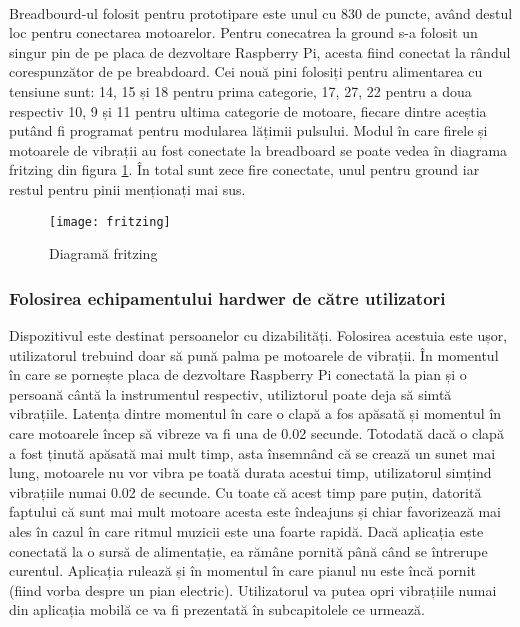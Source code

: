 \documentclass[../IoMusT.tex]{subfiles}
\begin{document}
\\
\par Breadbourd-ul folosit pentru prototipare este unul cu 830 de puncte, având destul loc pentru conectarea motoarelor. Pentru conecatrea la ground s-a folosit un singur pin de pe placa de dezvoltare  Raspberry Pi, acesta fiind conectat la rândul corespunzător de pe breabdoard. Cei nouă pini folosiți pentru alimentarea cu tensiune sunt: 14, 15 și 18 pentru prima categorie, 17, 27, 22 pentru a doua respectiv 10, 9 și 11 pentru ultima categorie de motoare, fiecare dintre aceștia putând fi programat pentru modularea lățimii pulsului. Modul în care firele și motoarele de vibrații au fost conectate la breadboard se poate vedea în diagrama fritzing din figura \ref{fig:breadboardConnection}. În total sunt zece fire conectate, unul pentru ground iar restul pentru pinii menționați mai sus.
\begin{figure}[h]
\centering
\texttt{[image: fritzing]}
\caption{Diagramă fritzing}
\label{fig:breadboardConnection}
\end{figure}  
\newpage
\subsubsection{Folosirea echipamentului hardwer de către utilizatori}
Dispozitivul este destinat persoanelor  cu dizabilități. Folosirea acestuia este ușor, utilizatorul trebuind doar să pună palma pe motoarele de vibrații. În momentul în care se pornește placa de dezvoltare Raspberry Pi conectată la pian și o persoană cântă la instrumentul respectiv, utiliztorul poate deja să simtă vibrațiile. Latența dintre momentul în care o clapă a fos apăsată și momentul în care motoarele încep să vibreze va fi una de 0.02 secunde. Totodată dacă o clapă a fost ținută apăsată mai mult timp, asta însemnând că se crează un sunet mai lung, motoarele nu vor vibra pe toată durata acestui timp, utilizatorul simțind vibrațiile numai 0.02 de secunde. Cu toate că acest timp pare puțin, datorită faptului că sunt mai mult motoare acesta este îndeajuns și chiar favorizează mai ales în cazul în care ritmul muzicii este una foarte rapidă. Dacă aplicația este conectată la o sursă de alimentație, ea rămâne pornită până când se întrerupe curentul. Aplicația rulează și în momentul în care pianul nu este încă pornit (fiind vorba despre un pian electric). Utilizatorul va putea opri vibrațiile numai din aplicația mobilă ce va fi prezentată în subcapitolele ce urmează.
\end{document}

